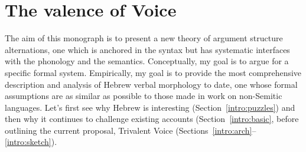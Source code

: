 \chapter{The valence of Voice}
\label{chap:intro}

The aim of this monograph is to present a new theory of argument structure alternations, one which is anchored in the syntax but has systematic interfaces with the phonology and the semantics. Conceptually, my goal is to argue for a specific formal system. Empirically, my goal is to provide the most comprehensive description and analysis of Hebrew verbal morphology to date, one whose formal assumptions are as similar as possible to those made in work on non-Semitic languages. Let's first see why Hebrew is interesting (Section~\ref{intro:puzzles}) and then why it continues to challenge existing accounts (Section~\ref{intro:basic}, before outlining the current proposal, Trivalent Voice (Sections~\ref{intro:arch}--\ref{intro:sketch}).

